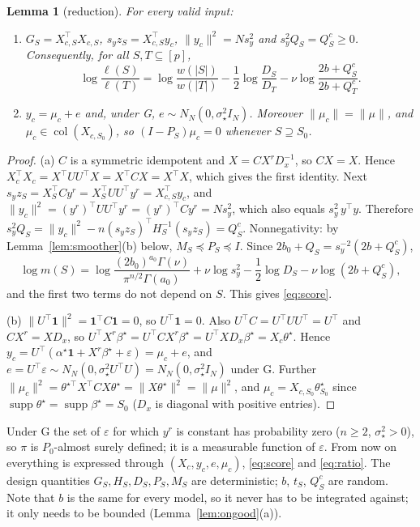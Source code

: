 \documentclass[11pt]{article}
\newtheorem{lemma}[theorem]{Lemma}
\theoremstyle{definition}
\newcommand{\Pp}{P_0}
\newcommand{\1}{\mathbf 1}
\newcommand{\sst}{\sigma_\star^2}
\newcommand{\tr}{^{\top}}
\begin{document}
\begin{lemma}[reduction]\label{lem:red}
For every valid input:
\begin{enumerate}
\item[(a)] $G_S=X_{c,S}\tr X_{c,S}$, $s_yz_S=X_{c,S}\tr y_c$, $\|y_c\|^2=Ns_y^2$ and $s_y^2Q_S=Q^c_S\ge0$. Consequently, for all $S,T\subseteq[p]$,
\begin{equation}\label{eq:score}
\log\frac{\ell(S)}{\ell(T)}=\log\frac{w(|S|)}{w(|T|)}-\frac12\log\frac{D_S}{D_T}-\nu\log\frac{2b+Q^c_S}{2b+Q^c_T}.
\end{equation}
\item[(b)] $y_c=\mu_c+e$ and, under G, $e\sim N_N(0,\sst I_N)$. Moreover $\|\mu_c\|=\|\mu\|$, and $\mu_c\in\operatorname{col}(X_{c,S_0})$, so $(I-P_S)\mu_c=0$ whenever $S\supseteq S_0$.
\end{enumerate}
\end{lemma}

\begin{proof}
(a) $C$ is a symmetric idempotent and $X=CX^rD_x^{-1}$, so $CX=X$. Hence $X_c\tr X_c=X\tr UU\tr X=X\tr CX=X\tr X$, which gives the first identity. Next $s_yz_S=X_S\tr Cy^r=X_S\tr UU\tr y^r=X_{c,S}\tr y_c$, and $\|y_c\|^2=(y^r)\tr UU\tr y^r=(y^r)\tr Cy^r=Ns_y^2$, which also equals $s_y^2\,y\tr y$. Therefore $s_y^2Q_S=\|y_c\|^2-n(s_yz_S)\tr H_S^{-1}(s_yz_S)=Q^c_S$. Nonnegativity: by Lemma~\ref{lem:smoother}(b) below, $M_S\preceq P_S\preceq I$. Since $2b_0+Q_S=s_y^{-2}(2b+Q^c_S)$,
\[
\log m(S)=\log\frac{(2b_0)^{a_0}\Gamma(\nu)}{\pi^{n/2}\Gamma(a_0)}+\nu\log s_y^2-\frac12\log D_S-\nu\log(2b+Q^c_S),
\]
and the first two terms do not depend on $S$. This gives \eqref{eq:score}.

(b) $\|U\tr\1\|^2=\1\tr C\1=0$, so $U\tr\1=0$. Also $U\tr C=U\tr UU\tr=U\tr$ and $CX^r=XD_x$, so $U\tr X^r\beta^\star=U\tr CX^r\beta^\star=U\tr XD_x\beta^\star=X_c\theta^\star$. Hence $y_c=U\tr(\alpha^\star\1+X^r\beta^\star+\varepsilon)=\mu_c+e$, and $e=U\tr\varepsilon\sim N_N(0,\sst U\tr U)=N_N(0,\sst I_N)$ under G. Further $\|\mu_c\|^2=\theta^{\star\top}X\tr CX\theta^\star=\|X\theta^\star\|^2=\|\mu\|^2$, and $\mu_c=X_{c,S_0}\theta^\star_{S_0}$ since $\operatorname{supp}\theta^\star=\operatorname{supp}\beta^\star=S_0$ ($D_x$ is diagonal with positive entries).
\end{proof}

Under G the set of $\varepsilon$ for which $y^r$ is constant has probability zero ($n\ge2$, $\sst>0$), so $\pi$ is $\Pp$-almost surely defined; it is a measurable function of $\varepsilon$. From now on everything is expressed through $(X_c,y_c,e,\mu_c)$, \eqref{eq:score} and \eqref{eq:ratio}. The design quantities $G_S,H_S,D_S,P_S,M_S$ are deterministic; $b$, $t_S$, $Q^c_S$ are random. Note that $b$ is the same for every model, so it never has to be integrated against; it only needs to be bounded (Lemma~\ref{lem:ongood}(a)).
\end{document}

